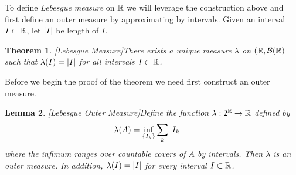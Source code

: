 \documentclass{amsart}
\newtheorem{thm}{Theorem}[section]
\newtheorem{lem}[thm]{Lemma}
\theoremstyle{remark}
\theoremstyle{definition}
\begin{document}
To define \emph{Lebesgue measure} on $\mathbb{R}$ we will leverage the
construction above and first define an outer measure by approximating
by intervals.  Given an interval $I \subset \mathbb{R}$, let $\left \vert I \right \vert$ be
length of $I$.
\begin{thm}\label{LebesgueMeasure}[Lebesgue Measure]There exists a
  unique measure $\lambda$ on $(\mathbb{R}, \mathcal{B}(\mathbb{R})$ such that
  $\lambda(I) = \left \vert I \right \vert$ for all intervals $I \subset \mathbb{R}$.
\end{thm}
Before we begin the proof of the theorem we need first construct an
outer measure.
\begin{lem}\label{LebesgueOuterMeasure}[Lebesgue Outer Measure]Define the function $\lambda : 2^{\mathbb{R}} \to \mathbb{R}$ defined by 
\begin{align*}
\lambda(A) &= \inf_{\{I_k\}} \sum_k \left \vert I_k \right \vert 
\end{align*}
where the infimum ranges over countable covers of $A$ by intervals.
Then $\lambda$ is
an outer measure.  In addition, $\lambda(I) = \left \vert I \right \vert$ for every
interval $I \subset \mathbb{R}$.
\end{lem}
\end{document}
